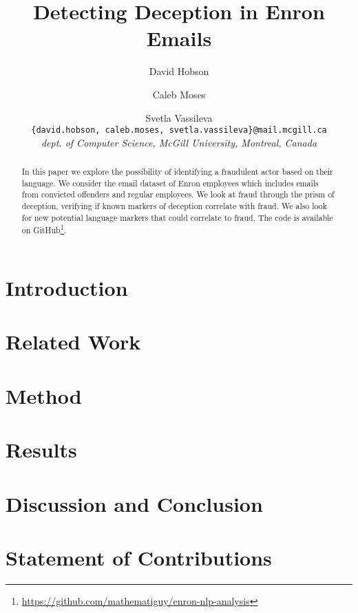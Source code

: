 \documentclass[11pt]{article}
\title{Detecting Deception in Enron Emails}
\author{David Hobson \and Caleb Moses \and Svetla Vassileva \\
  \texttt{\{david.hobson, caleb.moses, svetla.vassileva\}@mail.mcgill.ca} \\
  \textit{dept. of Computer Science, McGill University, Montreal, Canada}}
\begin{document}
\pagestyle{plain}
\thispagestyle{plain}

\maketitle
\begin{abstract}
In this paper we explore the possibility of identifying a fraudulent actor based on their language. We consider the email dataset of Enron employees which includes emails from convicted offenders and regular employees. We look at fraud through the prism of deception, verifying if known markers of deception correlate with fraud. We also look for new potential language markers that could correlate to fraud. The code is available on GitHub\footnote{\url{https://github.com/mathematiguy/enron-nlp-analysis}}.
\end{abstract}


\section{Introduction}


\section{Related Work}


\section{Method}


\section{Results}


\section{Discussion and Conclusion}


\section{Statement of Contributions}







\end{document}
